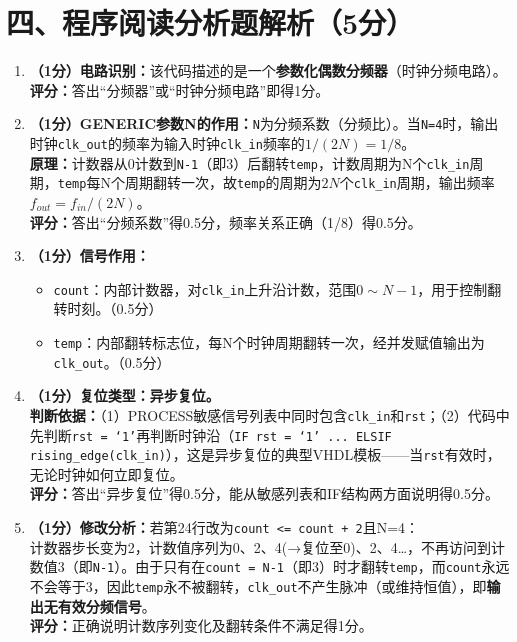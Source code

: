 \section{四、程序阅读分析题解析（5分）}

\begin{enumerate}[label=(\arabic*)]

\item \textbf{（1分）电路识别：}该代码描述的是一个\textbf{参数化偶数分频器}（时钟分频电路）。\\
\textbf{评分：}答出“分频器”或“时钟分频电路”即得1分。

\item \textbf{（1分）GENERIC参数N的作用：}\texttt{N}为分频系数（分频比）。当\texttt{N=4}时，输出时钟\texttt{clk\_out}的频率为输入时钟\texttt{clk\_in}频率的\textbf{$1/(2N) = 1/8$}。\\
\textbf{原理：}计数器从0计数到\texttt{N-1}（即3）后翻转\texttt{temp}，计数周期为N个\texttt{clk\_in}周期，\texttt{temp}每N个周期翻转一次，故\texttt{temp}的周期为$2N$个\texttt{clk\_in}周期，输出频率$f_{out} = f_{in}/(2N)$。\\
\textbf{评分：}答出“分频系数”得0.5分，频率关系正确（1/8）得0.5分。

\item \textbf{（1分）信号作用：}
\begin{itemize}
  \item \texttt{count}：内部计数器，对\texttt{clk\_in}上升沿计数，范围$0\sim N-1$，用于控制翻转时刻。（0.5分）
  \item \texttt{temp}：内部翻转标志位，每N个时钟周期翻转一次，经并发赋值输出为\texttt{clk\_out}。（0.5分）
\end{itemize}

\item \textbf{（1分）复位类型：异步复位。}\\
\textbf{判断依据：}（1）PROCESS敏感信号列表中同时包含\texttt{clk\_in}和\texttt{rst}；（2）代码中先判断\texttt{rst = `1'}再判断时钟沿（\texttt{IF rst = `1' ... ELSIF rising\_edge(clk\_in)}），这是异步复位的典型VHDL模板——当\texttt{rst}有效时，无论时钟如何立即复位。\\
\textbf{评分：}答出“异步复位”得0.5分，能从敏感列表和IF结构两方面说明得0.5分。

\item \textbf{（1分）修改分析：}若第24行改为\texttt{count <= count + 2}且N=4：\\
计数器步长变为2，计数值序列为0、2、4(→复位至0)、2、4…，不再访问到计数值3（即\texttt{N-1}）。由于只有在\texttt{count = N-1}（即3）时才翻转\texttt{temp}，而\texttt{count}永远不会等于3，因此\texttt{temp}永不被翻转，\texttt{clk\_out}不产生脉冲（或维持恒值），即\textbf{输出无有效分频信号}。\\
\textbf{评分：}正确说明计数序列变化及翻转条件不满足得1分。

\end{enumerate}

